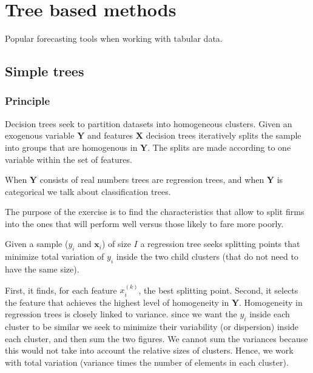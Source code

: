 \section{Tree based methods}

Popular forecasting tools when working with tabular data.

\subsection{Simple trees}

\subsubsection{Principle}
Decision trees seek to partition datasets into homogeneous clusters. Given an exogenous variable $\boldsymbol{Y}$ and features $\boldsymbol{X}$ decision trees iteratively splits the sample into groups that are homogenous in $\boldsymbol{Y}$. The splits are made according to one variable within the set of features.

When $\boldsymbol{Y}$ consists of real numbers trees are regression trees, and when $\boldsymbol{Y}$ is categorical we talk about classification trees.

The purpose of the exercise is to find the characteristics that allow to split firms into the ones that will perform well versus those likely to fare more poorly.

Given a sample ($y_{i}$ and $\mathbf{x}_{i}$) of size $I$ a regression tree seeks splitting points that minimize total variation of $y_{i}$ inside the two child clusters (that do not need to have the same size).

First, it finds, for each feature $x_{i}^{(k)}$, the best splitting point. Second, it selects the feature that achieves the highest level of homogeneity in $\mathbf{Y}$.
Homogeneity in regression trees is closely linked to variance. since we want the $y_{i}$ inside each cluster to be similar we seek to minimize their variability (or dispersion) inside each cluster, and then sum the two figures. We cannot sum the variances because this would not take into account the relative sizes of clusters. Hence, we work with total variation (variance times the number of elements in each cluster).

